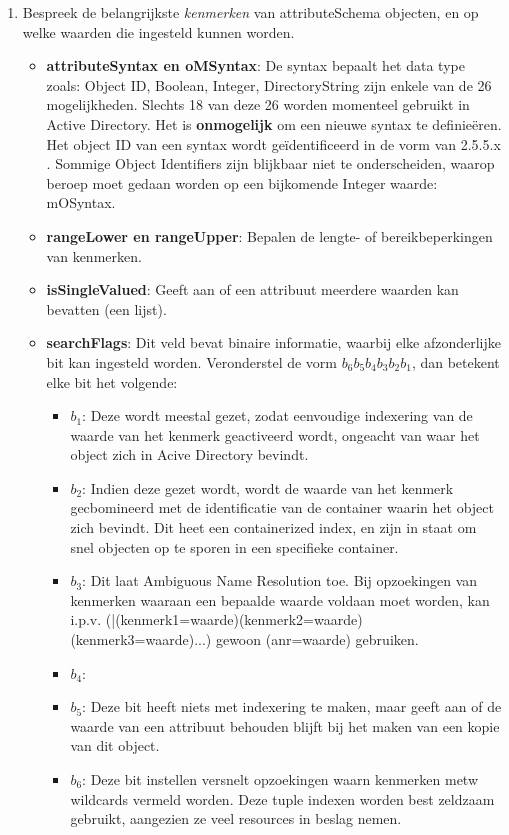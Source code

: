 \documentclass{report}
\newcommand{\vraag}[2]{
	\item #1
	
	#2
}
\begin{document}
\begin{enumerate}
		\vraag { Bespreek de belangrijkste \textit{kenmerken} van attributeSchema objecten, en op welke waarden die ingesteld kunnen worden. } { 
		\begin{itemize}
			\item \textbf{attributeSyntax en oMSyntax}: De syntax bepaalt het data type zoals: Object ID, Boolean, Integer, DirectoryString zijn enkele van de 26 mogelijkheden. Slechts 18 van deze 26 worden momenteel gebruikt in Active Directory. Het is \textbf{onmogelijk} om een nieuwe syntax te definieëren. Het object ID van een syntax wordt geïdentificeerd in de vorm van 2.5.5.x . Sommige Object Identifiers zijn blijkbaar niet te onderscheiden, waarop beroep moet gedaan worden op een bijkomende Integer waarde: mOSyntax.
			\item \textbf{rangeLower en rangeUpper}: Bepalen de lengte- of bereikbeperkingen van kenmerken.
			\item \textbf{isSingleValued}: Geeft aan of een attribuut meerdere waarden kan bevatten (een lijst).
			\item \textbf{searchFlags}: Dit veld bevat binaire informatie, waarbij elke afzonderlijke bit kan ingesteld worden. Veronderstel de vorm $b_6b_5b_4b_3b_2b_1$, dan betekent elke bit het volgende:
			\begin{itemize}
				\item \textbf{$b_1$}: Deze wordt meestal gezet, zodat eenvoudige indexering van de waarde van het kenmerk geactiveerd wordt, ongeacht van waar het object zich in Acive Directory bevindt.
				\item \textbf{$b_2$}: Indien deze gezet wordt, wordt de waarde van het kenmerk gecbomineerd met de identificatie van de container waarin het object zich bevindt. Dit heet een containerized index, en zijn in staat om snel objecten op te sporen in een specifieke container.
				\item \textbf{$b_3$}: Dit laat Ambiguous Name Resolution toe. Bij opzoekingen van kenmerken waaraan een bepaalde waarde voldaan moet worden, kan i.p.v. (|(kenmerk1=waarde)(kenmerk2=waarde)(kenmerk3=waarde)...) gewoon (anr=waarde) gebruiken. 
				\item \textbf{$b_4$}: \accentuate{(staat niets over in de cursus)}
				\item \textbf{$b_5$}: Deze bit heeft niets met indexering te maken, maar geeft aan of de waarde van een attribuut behouden blijft bij het maken van een kopie van dit object.
				\item \textbf{$b_6$}: Deze bit instellen versnelt opzoekingen waarn kenmerken metw wildcards vermeld worden. Deze tuple indexen worden best zeldzaam gebruikt, aangezien ze veel resources in beslag nemen.

\end{itemize}
\end{itemize}}
\end{enumerate}
\end{document}
